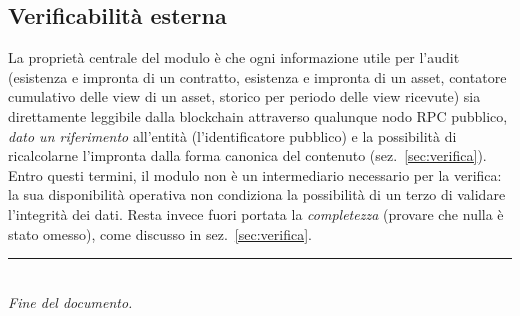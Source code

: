 \documentclass[a4paper,11pt]{article}
\begin{document}
\subsection{Verificabilit\`a esterna}

La propriet\`a centrale del modulo \`e che ogni informazione utile per l'audit (esistenza e impronta di un contratto, esistenza e impronta di un asset, contatore cumulativo delle view di un asset, storico per periodo delle view ricevute) sia direttamente leggibile dalla blockchain attraverso qualunque nodo RPC pubblico, \emph{dato un riferimento} all'entit\`a (l'identificatore pubblico) e la possibilit\`a di ricalcolarne l'impronta dalla forma canonica del contenuto (sez.~\ref{sec:verifica}). Entro questi termini, il modulo non \`e un intermediario necessario per la verifica: la sua disponibilit\`a operativa non condiziona la possibilit\`a di un terzo di validare l'integrit\`a dei dati. Resta invece fuori portata la \emph{completezza} (provare che nulla \`e stato omesso), come discusso in sez.~\ref{sec:verifica}.

\vfill
\begin{center}
\rule{0.5\textwidth}{0.4pt}\\[0.3em]
\small\itshape Fine del documento.
\end{center}
\end{document}
